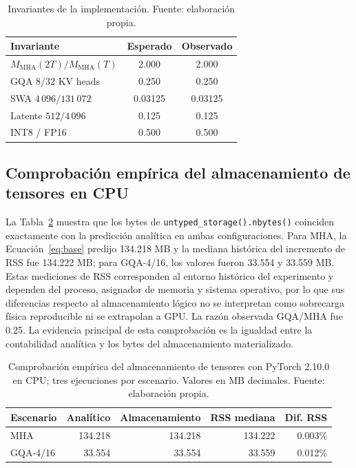 \documentclass[a4paper,twocolumn]{article}
\begin{document}
\begin{table}[!ht]
\centering\small
\caption{Invariantes de la implementación. Fuente: elaboración propia.}\label{tab:invariants}
\begin{tabular}{lcc}
\toprule
Invariante & Esperado & Observado \\
\midrule
$M_{\mathrm{MHA}}(2T)/M_{\mathrm{MHA}}(T)$ & 2.000 & 2.000 \\
GQA $8/32$ KV heads & 0.250 & 0.250 \\
SWA $4\,096/131\,072$ & 0.03125 & 0.03125 \\
Latente $512/4\,096$ & 0.125 & 0.125 \\
INT8 / FP16 & 0.500 & 0.500 \\
\bottomrule
\end{tabular}
\end{table}

\subsection{Comprobación empírica del almacenamiento de tensores en CPU}
La Tabla~\ref{tab:pytorch-profile} muestra que los bytes de \texttt{untyped\_storage().nbytes()} coinciden exactamente con la predicción analítica en ambas configuraciones. Para MHA, la Ecuación~\eqref{eq:base} predijo 134.218 MB y la mediana histórica del incremento de RSS fue 134.222 MB; para GQA-4/16, los valores fueron 33.554 y 33.559 MB. Estas mediciones de RSS corresponden al entorno histórico del experimento y dependen del proceso, asignador de memoria y sistema operativo, por lo que sus diferencias respecto al almacenamiento lógico no se interpretan como sobrecarga física reproducible ni se extrapolan a GPU. La razón observada GQA/MHA fue 0.25. La evidencia principal de esta comprobación es la igualdad entre la contabilidad analítica y los bytes del almacenamiento materializado.

\begin{table}[!ht]
\centering\scriptsize
\caption{Comprobación empírica del almacenamiento de tensores con PyTorch 2.10.0 en CPU; tres ejecuciones por escenario. Valores en MB decimales. Fuente: elaboración propia.}\label{tab:pytorch-profile}
\begin{tabular}{lrrrr}
\toprule
Escenario & Analítico & Almacenamiento & RSS mediana & Dif. RSS \\
\midrule
MHA & 134.218 & 134.218 & 134.222 & 0.003\% \\
GQA-4/16 & 33.554 & 33.554 & 33.559 & 0.012\% \\
\bottomrule
\end{tabular}
\end{table}
\end{document}
